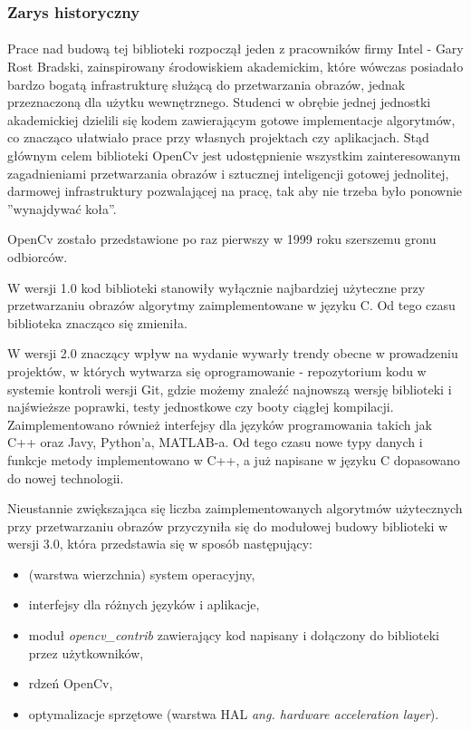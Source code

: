 \documentclass[a4paper,12pt]{article}
\begin{document}
		\subsubsection{Zarys historyczny}
			\paragraph{\indent}  Prace nad budową tej biblioteki rozpoczął jeden z        pracowników firmy Intel - Gary Rost Bradski, zainspirowany środowiskiem     akademickim, które wówczas posiadało bardzo bogatą                          infrastrukturę służącą do przetwarzania obrazów, jednak                     przeznaczoną dla użytku wewnętrznego. Studenci w obrębie jednej             jednostki akademickiej dzielili się kodem zawierającym gotowe               implementacje algorytmów, co znacząco ułatwiało prace przy własnych         projektach czy aplikacjach. 
				Stąd głównym celem biblioteki OpenCv jest udostępnienie wszystkim zainteresowanym zagadnieniami przetwarzania obrazów i sztucznej inteligencji gotowej jednolitej, darmowej infrastruktury pozwalającej na pracę, tak aby nie trzeba było ponownie ''wynajdywać koła''.\par
				OpenCv zostało przedstawione po raz pierwszy w 1999 roku szerszemu gronu odbiorców. \par  
                 W wersji 1.0 kod biblioteki stanowiły wyłącznie najbardziej użyteczne przy przetwarzaniu obrazów
				algorytmy zaimplementowane w języku C. 
				Od tego czasu biblioteka znacząco się zmieniła. \par
			    W wersji 2.0 znaczący wpływ na wydanie wywarły trendy obecne w prowadzeniu projektów, w których wytwarza się oprogramowanie - repozytorium kodu w systemie kontroli wersji Git, gdzie możemy znaleźć najnowszą wersję biblioteki i najświeższe poprawki, testy jednostkowe czy booty ciągłej kompilacji. 
				Zaimplementowano również interfejsy dla języków programowania takich jak C++ oraz Javy, Python’a, MATLAB-a.
				Od tego czasu nowe typy danych i funkcje metody implementowano w C++, a już napisane w języku C dopasowano do nowej technologii. \par
				Nieustannie zwiększająca się liczba zaimplementowanych algorytmów użytecznych przy przetwarzaniu obrazów przyczyniła się do modułowej budowy biblioteki w wersji 3.0, która przedstawia się w sposób następujący:
                
                \begin{spacing}{1}
    				\begin{itemize}
    					\item (warstwa wierzchnia) system operacyjny,
    					\item interfejsy dla różnych języków i aplikacje,
    					\item moduł \textit {opencv\_contrib} zawierający kod napisany i dołączony do biblioteki przez użytkowników,
    					\item rdzeń OpenCv,
    					\item optymalizacje sprzętowe (warstwa HAL \textit {ang. hardware acceleration layer}).
    				\end{itemize} 
                \end{spacing}
            
\end{document}
